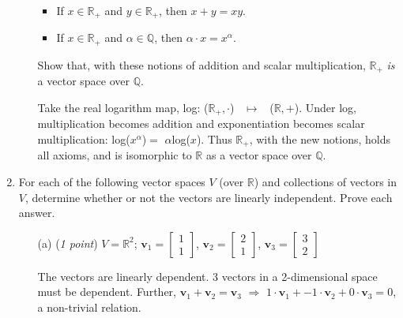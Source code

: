 \documentclass[11pt]{article}
\newcommand{\bbQ}{\mathbb{Q}}
\newcommand{\bbR}{\mathbb{R}}
\theoremstyle{definition}
\numberwithin{equation}{subsection}
\begin{document}
\begin{enumerate}
\begin{enumerate}
\begin{itemize}
\item If $x\in\mathbb{R}_+$ and $y\in\mathbb{R}_+$, then $x+y=xy$.
\item If $x\in\mathbb{R}_+$ and $\alpha\in\mathbb{Q}$, then $\alpha \cdot x=x^{\alpha}$.

\end{itemize}

Show that, with these notions of addition and scalar multiplication, $\mathbb{R}_+$ \emph{is} a vector space over $\mathbb{Q}$.
\item[] Take the real logarithm map, log: ($\bbR_+, \cdot$) \ $\mapsto$ \ ($\bbR,+$). Under log, multiplication becomes addition and exponentiation becomes scalar multiplication: log($x^\alpha$)$=$ $\alpha$log($x$). Thus $\bbR_+$, with the new notions, holds all axioms, and is isomorphic to $\bbR$ as a vector space over $\bbQ$. 

\end{enumerate}

\item For each of the following vector spaces $V$ (over $\bbR$) and collections of vectors in $V$, determine whether or not the vectors are linearly independent. Prove each answer.

\begin{enumerate}

\item[(a)] (\emph{1 point}) $V=\mathbb{R}^2$;\; $\mathbf{v}_1=\begin{bmatrix} 1\\ 1\end{bmatrix}$,\; $\mathbf{v}_2=\begin{bmatrix} 2\\ 1\end{bmatrix}$,\; $\mathbf{v}_3=\begin{bmatrix} 3\\ 2\end{bmatrix}$
\item[] The vectors are linearly dependent. 3 vectors in a 2-dimensional space must be dependent. Further, $\mathbf{v}_1 +\mathbf{v}_2 = \mathbf{v}_3$ $\Rightarrow $ $1\cdot \mathbf{v}_1 + -1\cdot \mathbf{v}_2 + 0\cdot \mathbf{v}_3=0$, a non-trivial relation.


\end{enumerate}
\end{enumerate}
\end{document}
